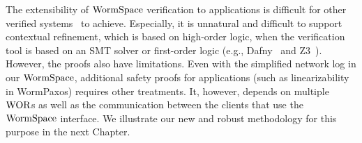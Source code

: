 	
The extensibility of $\mathrm{WormSpace}$ verification to applications is difficult for other verified systems~\cite{ironfleet, hyperkernel} to achieve. 
Especially, it is unnatural and difficult to support contextual refinement, 
which is based on high-order logic, when the verification tool is based on an SMT solver or first-order logic (e.g., Dafny~\cite{dafny} 
and Z3~\cite{moura08}). 
However, the proofs also have limitations. 
Even with the simplified network log in our $\mathrm{WormSpace}$, additional safety proofs for applications (such as linearizability in WormPaxos) 
requires other treatments. 
It, however, depends on multiple $\mathrm{WOR}$s as well as the communication between the clients that use the $\mathrm{WormSpace}$ interface. 
We illustrate our new and robust methodology for this purpose in the next Chapter.


